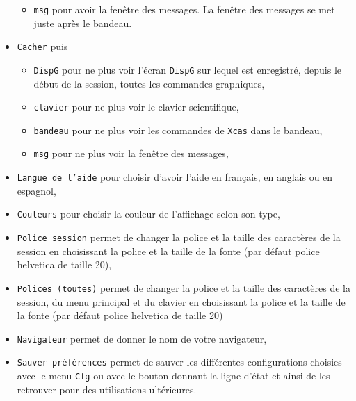 \documentclass[a4paper,11pt]{article}
\begin{document}
\begin{itemize}
\begin{itemize}
\item 
{\tt msg} pour avoir la fen\^etre des messages. La fen\^etre des 
messages se met juste apr\`es le bandeau.
\end{itemize}
\item
{\tt Cacher} puis 
\begin{itemize}
\item {\tt DispG} pour ne plus voir l'\'ecran {\tt DispG} sur lequel est 
enregistr\'e, depuis le d\'ebut de la session, toutes les commandes graphiques,
\item {\tt clavier} pour ne plus voir le clavier scientifique, 
\item {\tt bandeau} pour ne plus voir les commandes de {\tt Xcas} dans 
le bandeau,
\item {\tt msg} pour ne plus voir la fen\^etre des messages,
\end{itemize}
\item{\tt Langue de l'aide} pour choisir d'avoir l'aide en fran\c{c}ais, 
en anglais ou en espagnol,
\item{\tt Couleurs} pour choisir la couleur de l'affichage selon son type, 
\item{\tt Police session} permet de changer la police et la taille des 
caract\`eres de la session en choisissant la police et la taille de la fonte 
(par d\'efaut police helvetica de taille 20),
\item{\tt Polices (toutes)} permet de changer la police et la taille des 
caract\`eres  de la session, du menu principal et du  clavier en choisissant la
police et la taille de la fonte (par d\'efaut police helvetica de taille 20)
\item{\tt Navigateur} permet de donner le nom de votre navigateur,
\item {\tt Sauver pr\'ef\'erences} permet de sauver les diff\'erentes 
configurations choisies avec le menu {\tt Cfg} ou avec le bouton donnant la
ligne d'\'etat et ainsi de les retrouver pour des utilisations ult\'erieures.
\end{itemize}
\end{document}
